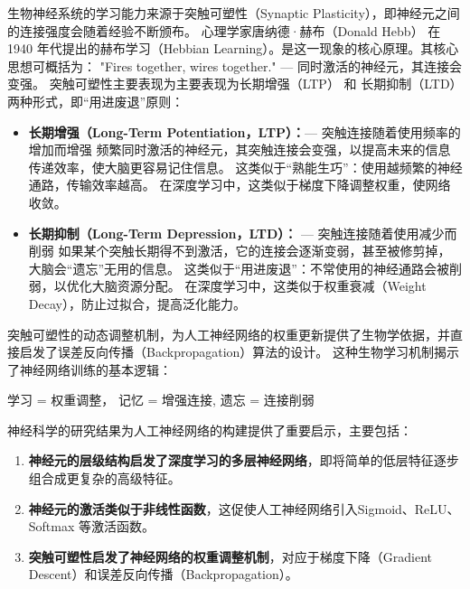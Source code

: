 生物神经系统的学习能力来源于突触可塑性（Synaptic Plasticity），即神经元之间的连接强度会随着经验不断颁布。
心理学家唐纳德·赫布（Donald Hebb） 在 1940 年代提出的赫布学习（Hebbian Learning）。是这一现象的核心原理。其核心思想可概括为：
"Fires together, wires together." --- 同时激活的神经元，其连接会变强。
突触可塑性主要表现为主要表现为长期增强（LTP） 和 长期抑制（LTD） 两种形式，即“用进废退”原则：
\begin{itemize}
\item {\bf 长期增强（Long-Term Potentiation，LTP）：}--- 突触连接随着使用频率的增加而增强
频繁同时激活的神经元，其突触连接会变强，以提高未来的信息传递效率，使大脑更容易记住信息。
这类似于“熟能生巧”：使用越频繁的神经通路，传输效率越高。
在深度学习中，这类似于梯度下降调整权重，使网络收敛。
\item {\bf 长期抑制（Long-Term Depression，LTD）：} --- 突触连接随着使用减少而削弱
如果某个突触长期得不到激活，它的连接会逐渐变弱，甚至被修剪掉，大脑会“遗忘”无用的信息。
这类似于“用进废退”：不常使用的神经通路会被削弱，以优化大脑资源分配。
在深度学习中，这类似于权重衰减（Weight Decay），防止过拟合，提高泛化能力。
\end{itemize}
突触可塑性的动态调整机制，为人工神经网络的权重更新提供了生物学依据，并直接启发了误差反向传播（Backpropagation）算法的设计。
这种生物学习机制揭示了神经网络训练的基本逻辑：
\begin{center}
学习 = 权重调整， \quad
记忆 = 增强连接, \quad
遗忘 = 连接削弱
\end{center}
神经科学的研究结果为人工神经网络的构建提供了重要启示，主要包括：
\begin{enumerate}
\item {\bf 神经元的层级结构启发了深度学习的多层神经网络}，即将简单的低层特征逐步组合成更复杂的高级特征。
\item {\bf 神经元的激活类似于非线性函数}，这促使人工神经网络引入Sigmoid、ReLU、Softmax 等激活函数。
\item {\bf 突触可塑性启发了神经网络的权重调整机制}，对应于梯度下降（Gradient Descent）和误差反向传播（Backpropagation）。
\end{enumerate}
